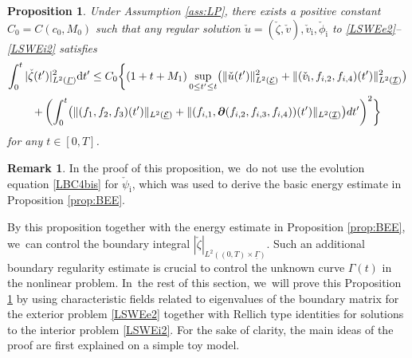 \documentclass[11pt]{article}
\newcommand{\cI}{{\mathcal I}}
\newcommand{\cE}{{\mathcal E}}
\newcommand{\ul}[1]{\underline{#1}}
\newcommand{\itGamma}{\mathit{\Gamma}}
\newtheorem{proposition}[theorem]{Proposition}
\theoremstyle{definition}
\newtheorem{remark}[theorem]{Remark}
\begin{document}
\begin{proposition}\label{prop:ABR}
Under Assumption \ref{ass:LP}, there exists a positive constant $C_0=C(c_0,M_0)$ such that any regular solution
$\check{u}=(\check{\zeta},\check{v}), \check{v}_\mathrm{i}, \check{\phi}_\mathrm{i}$ to \eqref{LSWEe2}--\eqref{LSWEi2} satisfies
\begin{multline*}
\int_0^t|\check{\zeta}(t') |_{L^2(\ul{\itGamma})}^2\mathrm{d}t'
\leq C_0 \biggl\{ (1+t+M_1)\sup_{0\leq t'\leq t}\bigl(\|\check{u}(t')\|_{L^2(\ul{\cE})}^2
+ \|(\check{v}_\mathrm{i},f_{{\rm i},2},f_{{\rm i},4})(t')\|_{L^2(\ul{\cI})}^2 \bigr) \\
+ \left(\int_0^t \bigl(\|(f_1,f_2,f_3)(t')\|_{L^2(\ul{\cE})}
+ \|(f_{{\rm i},1},\bm{\partial}(f_{{\rm i},2},f_{{\rm i},3},f_{{\rm i},4}))(t')\|_{L^2(\ul{\cI})} \bigr){\rm d}t' \right)^2 \biggr\}
\end{multline*}
for any $t\in[0,T]$.
\end{proposition}

\begin{remark}
In the proof of this proposition, we~do not use the evolution equation \eqref{LBC4bis} for $\check{\psi}_\mathrm{i}$,
which was used to derive the basic energy estimate in Proposition \ref{prop:BEE}.
\end{remark}

By this proposition together with the energy estimate in Proposition \ref{prop:BEE}, we~can control the boundary integral
$|\check{\zeta}|_{L^2((0,T)\times\ul{\itGamma})}$.
Such an additional boundary regularity estimate is crucial to control the unknown curve $\itGamma(t)$ in the nonlinear problem. In~the rest of this section, we~will prove this Proposition \ref{prop:ABR} by using characteristic fields related to eigenvalues of the boundary matrix for the exterior problem \eqref{LSWEe2}
together with Rellich type identities for solutions to the interior problem \eqref{LSWEi2}.
For the sake of clarity, the main ideas of the proof are first explained on a simple toy model.
\end{document}
